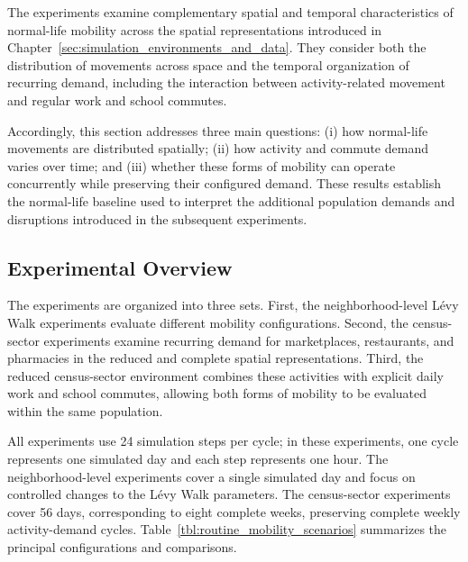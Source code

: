 The experiments examine complementary spatial and temporal characteristics of normal-life mobility across the spatial representations introduced in Chapter~\ref{sec:simulation_environments_and_data}. They consider both the distribution of movements across space and the temporal organization of recurring demand, including the interaction between activity-related movement and regular work and school commutes.

Accordingly, this section addresses three main questions: (i) how normal-life movements are distributed spatially; (ii) how activity and commute demand varies over time; and (iii) whether these forms of mobility can operate concurrently while preserving their configured demand. These results establish the normal-life baseline used to interpret the additional population demands and disruptions introduced in the subsequent experiments.


\subsection{Experimental Overview}
\label{sec:routine_mobility_overview}

The experiments are organized into three sets. First, the neighborhood-level Lévy Walk experiments evaluate different mobility configurations. Second, the census-sector experiments examine recurring demand for marketplaces, restaurants, and pharmacies in the reduced and complete spatial representations. Third, the reduced census-sector environment combines these activities with explicit daily work and school commutes, allowing both forms of mobility to be evaluated within the same population.


All experiments use 24 simulation steps per cycle; in these experiments, one cycle represents one simulated day and each step represents one hour. The neighborhood-level experiments cover a single simulated day and focus on controlled changes to the Lévy Walk parameters. The census-sector experiments cover 56 days, corresponding to eight complete weeks, preserving complete weekly activity-demand cycles. Table~\ref{tbl:routine_mobility_scenarios} summarizes the principal configurations and comparisons.


